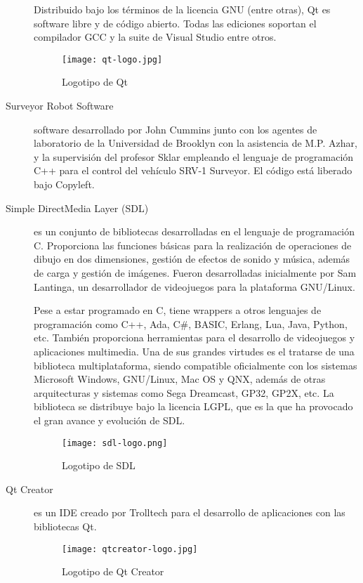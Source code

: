 \begin{description}
Distribuido bajo los términos de la licencia GNU (entre otras), Qt es software libre y de código abierto. Todas las ediciones soportan el compilador GCC y la suite de Visual Studio entre otros.

\begin{figure}[H]
  \begin{center}
    \texttt{[image: qt-logo.jpg]}
  \end{center}
  \caption{Logotipo de Qt}
  \label{SRV-1}
\end{figure}

\item [Surveyor Robot Software] software desarrollado por John Cummins junto con los agentes de laboratorio de la Universidad de Brooklyn con la asistencia de M.P. Azhar, y la supervisión del profesor Sklar empleando el lenguaje de programación C++ para el control del vehículo SRV-1 Surveyor. El código está liberado bajo Copyleft.

\item [Simple DirectMedia Layer (SDL)] es un conjunto de bibliotecas desarrolladas en el lenguaje de programación C. Proporciona las funciones básicas para la realización de operaciones de dibujo en dos dimensiones, gestión de efectos de sonido y música, además de carga y gestión de imágenes. Fueron desarrolladas inicialmente por Sam Lantinga, un desarrollador de videojuegos para la plataforma GNU/Linux.

Pese a estar programado en C, tiene wrappers a otros lenguajes de programación como C++, Ada, C\#, BASIC, Erlang, Lua, Java, Python, etc. También proporciona herramientas para el desarrollo de videojuegos y aplicaciones multimedia. Una de sus grandes virtudes es el tratarse de una biblioteca multiplataforma, siendo compatible oficialmente con los sistemas Microsoft Windows, GNU/Linux, Mac OS y QNX, además de otras arquitecturas y sistemas como Sega Dreamcast, GP32, GP2X, etc.
La biblioteca se distribuye bajo la licencia LGPL, que es la que ha provocado el gran avance y evolución de SDL.

\begin{figure}[H]
  \begin{center}
    \texttt{[image: sdl-logo.png]}
  \end{center}
  \caption{Logotipo de SDL}
  \label{SRV-1}
\end{figure}
\item [Qt Creator] es un IDE creado por Trolltech para el desarrollo de aplicaciones con las bibliotecas Qt.

\begin{figure}[H]
  \begin{center}
    \texttt{[image: qtcreator-logo.jpg]}
  \end{center}
  \caption{Logotipo de Qt Creator}
  \label{SRV-1}
\end{figure}

\end{description}

